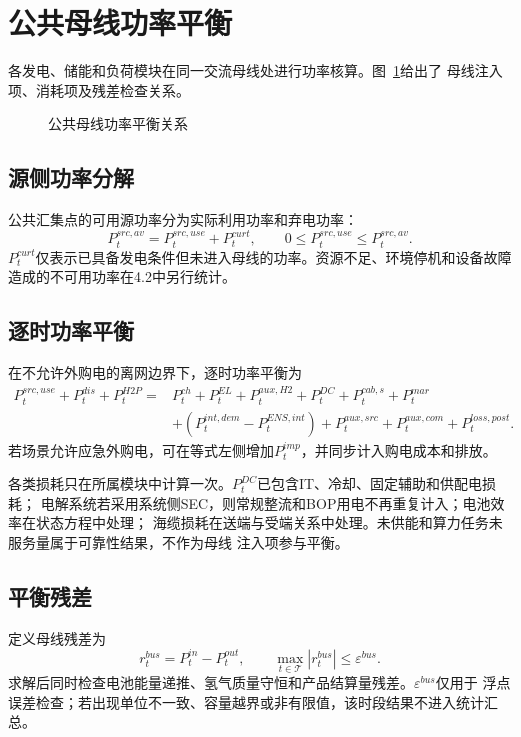 \section{公共母线功率平衡}
\label{sec:power-balance}

各发电、储能和负荷模块在同一交流母线处进行功率核算。图~\ref{fig:bus-ledger}给出了
母线注入项、消耗项及残差检查关系。
\begin{figure}[H]
\centering
\resizebox{0.90\textwidth}{!}{}
\caption{公共母线功率平衡关系}
\label{fig:bus-ledger}
\end{figure}

\subsection{源侧功率分解}

公共汇集点的可用源功率分为实际利用功率和弃电功率：
\begin{equation}
P_t^{src,av}=P_t^{src,use}+P_t^{curt},
\qquad 0\le P_t^{src,use}\le P_t^{src,av}.
\label{eq:bus-source-split}
\end{equation}
$P_t^{curt}$仅表示已具备发电条件但未进入母线的功率。资源不足、环境停机和设备故障
造成的不可用功率在4.2中另行统计。

\subsection{逐时功率平衡}

在不允许外购电的离网边界下，逐时功率平衡为
\begin{equation}
\begin{aligned}
P_t^{src,use}+P_t^{dis}+P_t^{H2P}
={}&P_t^{ch}+P_t^{EL}+P_t^{aux,H2}+P_t^{DC}
+P_t^{cab,s}+P_t^{mar}\\
&+\left(P_t^{int,dem}-P_t^{ENS,int}\right)
+P_t^{aux,src}+P_t^{aux,com}+P_t^{loss,post}.
\end{aligned}
\label{eq:master-bus}
\end{equation}
若场景允许应急外购电，可在等式左侧增加$P_t^{imp}$，并同步计入购电成本和排放。

各类损耗只在所属模块中计算一次。$P_t^{DC}$已包含IT、冷却、固定辅助和供配电损耗；
电解系统若采用系统侧SEC，则常规整流和BOP用电不再重复计入；电池效率在状态方程中处理；
海缆损耗在送端与受端关系中处理。未供能和算力任务未服务量属于可靠性结果，不作为母线
注入项参与平衡。

\subsection{平衡残差}

定义母线残差为
\begin{equation}
r_t^{bus}=P_t^{in}-P_t^{out},
\qquad
\max_{t\in\mathcal T}|r_t^{bus}|\le\varepsilon^{bus}.
\label{eq:bus-residual}
\end{equation}
求解后同时检查电池能量递推、氢气质量守恒和产品结算量残差。$\varepsilon^{bus}$仅用于
浮点误差检查；若出现单位不一致、容量越界或非有限值，该时段结果不进入统计汇总。
